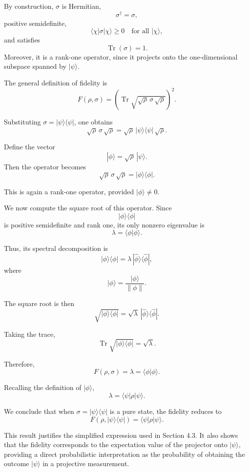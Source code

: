 \documentclass[a4paper]{article}
\begin{document}
By construction, $\sigma$ is Hermitian,
\[
\sigma^\dagger = \sigma,
\]
positive semidefinite,
\[
\langle \chi | \sigma | \chi \rangle \ge 0
\quad \text{for all } |\chi\rangle,
\]
and satisfies
\[
\operatorname{Tr}(\sigma) = 1.
\]
Moreover, it is a rank-one operator, since it projects onto the one-dimensional subspace spanned by $|\psi\rangle$.

\medskip

The general definition of fidelity is
\[
F(\rho,\sigma)
=
\left(\operatorname{Tr}\sqrt{\sqrt{\rho}\,\sigma\,\sqrt{\rho}}\right)^2.
\]

Substituting $\sigma = |\psi\rangle\langle\psi|$, one obtains
\[
\sqrt{\rho}\,\sigma\,\sqrt{\rho}
=
\sqrt{\rho}\,|\psi\rangle\langle\psi|\,\sqrt{\rho}.
\]

Define the vector
\[
|\phi\rangle = \sqrt{\rho}\,|\psi\rangle.
\]
Then the operator becomes
\[
\sqrt{\rho}\,\sigma\,\sqrt{\rho}
=
|\phi\rangle\langle\phi|.
\]

This is again a rank-one operator, provided $|\phi\rangle \neq 0$.

\medskip

We now compute the square root of this operator. Since
\[
|\phi\rangle\langle\phi|
\]
is positive semidefinite and rank one, its only nonzero eigenvalue is
\[
\lambda = \langle \phi | \phi \rangle.
\]

Thus, its spectral decomposition is
\[
|\phi\rangle\langle\phi|
=
\lambda\,|\hat{\phi}\rangle\langle\hat{\phi}|,
\]
where
\[
|\hat{\phi}\rangle = \frac{|\phi\rangle}{\|\phi\|}.
\]

The square root is then
\[
\sqrt{|\phi\rangle\langle\phi|}
=
\sqrt{\lambda}\,|\hat{\phi}\rangle\langle\hat{\phi}|.
\]

Taking the trace,
\[
\operatorname{Tr}\sqrt{|\phi\rangle\langle\phi|}
=
\sqrt{\lambda}.
\]

Therefore,
\[
F(\rho,\sigma)
=
\lambda
=
\langle \phi | \phi \rangle.
\]

Recalling the definition of $|\phi\rangle$,
\[
\lambda
=
\langle \psi | \rho | \psi \rangle.
\]

\medskip

We conclude that when $\sigma = |\psi\rangle\langle\psi|$ is a pure state, the fidelity reduces to
\[
F(\rho,|\psi\rangle\langle\psi|)
=
\langle \psi | \rho | \psi \rangle.
\]

\medskip

This result justifies the simplified expression used in Section 4.3. It also shows that the fidelity corresponds to the expectation value of the projector onto $|\psi\rangle$, providing a direct probabilistic interpretation as the probability of obtaining the outcome $|\psi\rangle$ in a projective measurement.
\end{document}
